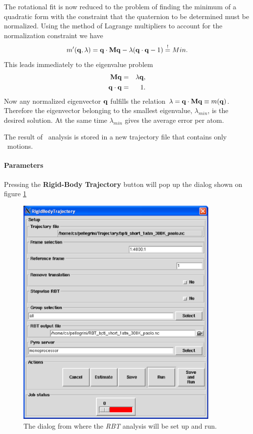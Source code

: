 \documentclass[a4paper,11pt]{report}
\begin{document}
The rotational fit is now reduced to the problem of finding the minimum of a quadratic form with the constraint that the 
quaternion to be determined must be normalized. Using the method of Lagrange multipliers to account for the normalization 
constraint we have 
\begin{equation}
m'({\bf q},\lambda) = {\bf q}\cdot{\bf M}{\bf q}
- \lambda({\bf q}\cdot{\bf q} - 1) \stackrel{!}{=} Min.
\end{equation}
This leads immediately to the eigenvalue problem
\begin{eqnarray}
{\bf M}{\bf q} &= &\lambda{\bf q},\\
{\bf q}\cdot{\bf q} &= &1.
\end{eqnarray}
Now any normalized eigenvector ${\bf q}$ fulfills the relation $\lambda = {\bf q}\cdot{\bf M}{\bf q} \equiv m({\bf q})$. 
Therefore the eigenvector belonging to the smallest eigenvalue, $\lambda_{min}$, is the desired solution. At the same 
time $\lambda_{min}$ gives the average error per atom.

The result of \RBT\ analysis is stored in a new trajectory file that contains only \RBT\ motions.

\paragraph{Parameters\\}
\label{rbt_parameters}
Pressing the \textbf{Rigid-Body Trajectory} button will pop up the dialog shown on figure \ref{fig:rbt}
\begin{figure}[h!]
\begin{center}
\includegraphics[width=10cm]{Figures/rbt.eps}
\end{center}
\caption[The \textit{RBT} analysis dialog]{The dialog from where the \textit{RBT} analysis will be set up and run.}
\label{fig:rbt}
\end{figure}   
\end{document}
